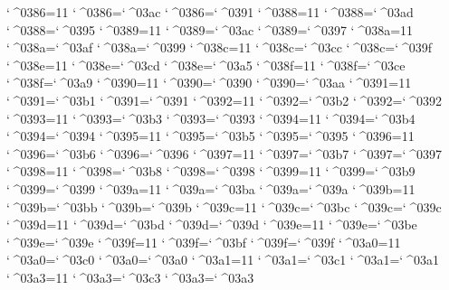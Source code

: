%
%
%
\catcode`^^^^0386=11 \lccode`^^^^0386=`^^^^03ac \uccode`^^^^0386=`^^^^0391 
\catcode`^^^^0388=11 \lccode`^^^^0388=`^^^^03ad \uccode`^^^^0388=`^^^^0395 
\catcode`^^^^0389=11 \lccode`^^^^0389=`^^^^03ac \uccode`^^^^0389=`^^^^0397 
\catcode`^^^^038a=11 \lccode`^^^^038a=`^^^^03af \uccode`^^^^038a=`^^^^0399 
\catcode`^^^^038c=11 \lccode`^^^^038c=`^^^^03cc \uccode`^^^^038c=`^^^^039f 
\catcode`^^^^038e=11 \lccode`^^^^038e=`^^^^03cd \uccode`^^^^038e=`^^^^03a5 
\catcode`^^^^038f=11 \lccode`^^^^038f=`^^^^03ce \uccode`^^^^038f=`^^^^03a9 
\catcode`^^^^0390=11 \lccode`^^^^0390=`^^^^0390 \uccode`^^^^0390=`^^^^03aa 
\catcode`^^^^0391=11 \lccode`^^^^0391=`^^^^03b1 \uccode`^^^^0391=`^^^^0391 
\catcode`^^^^0392=11 \lccode`^^^^0392=`^^^^03b2 \uccode`^^^^0392=`^^^^0392 
\catcode`^^^^0393=11 \lccode`^^^^0393=`^^^^03b3 \uccode`^^^^0393=`^^^^0393 
\catcode`^^^^0394=11 \lccode`^^^^0394=`^^^^03b4 \uccode`^^^^0394=`^^^^0394 
\catcode`^^^^0395=11 \lccode`^^^^0395=`^^^^03b5 \uccode`^^^^0395=`^^^^0395 
\catcode`^^^^0396=11 \lccode`^^^^0396=`^^^^03b6 \uccode`^^^^0396=`^^^^0396 
\catcode`^^^^0397=11 \lccode`^^^^0397=`^^^^03b7 \uccode`^^^^0397=`^^^^0397 
\catcode`^^^^0398=11 \lccode`^^^^0398=`^^^^03b8 \uccode`^^^^0398=`^^^^0398 
\catcode`^^^^0399=11 \lccode`^^^^0399=`^^^^03b9 \uccode`^^^^0399=`^^^^0399 
\catcode`^^^^039a=11 \lccode`^^^^039a=`^^^^03ba \uccode`^^^^039a=`^^^^039a 
\catcode`^^^^039b=11 \lccode`^^^^039b=`^^^^03bb \uccode`^^^^039b=`^^^^039b 
\catcode`^^^^039c=11 \lccode`^^^^039c=`^^^^03bc \uccode`^^^^039c=`^^^^039c 
\catcode`^^^^039d=11 \lccode`^^^^039d=`^^^^03bd \uccode`^^^^039d=`^^^^039d 
\catcode`^^^^039e=11 \lccode`^^^^039e=`^^^^03be \uccode`^^^^039e=`^^^^039e 
\catcode`^^^^039f=11 \lccode`^^^^039f=`^^^^03bf \uccode`^^^^039f=`^^^^039f 
\catcode`^^^^03a0=11 \lccode`^^^^03a0=`^^^^03c0 \uccode`^^^^03a0=`^^^^03a0 
\catcode`^^^^03a1=11 \lccode`^^^^03a1=`^^^^03c1 \uccode`^^^^03a1=`^^^^03a1 
\catcode`^^^^03a3=11 \lccode`^^^^03a3=`^^^^03c3 \uccode`^^^^03a3=`^^^^03a3 
